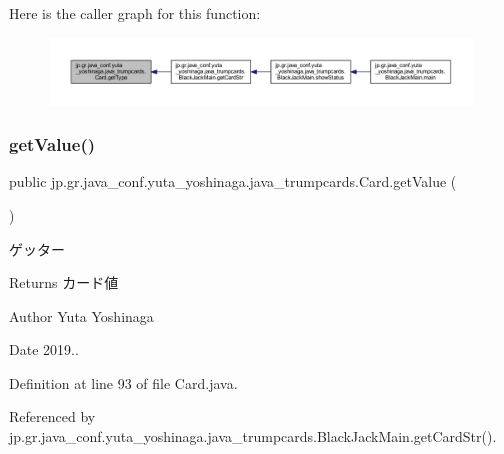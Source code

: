 Here is the caller graph for this function\+:
\nopagebreak
\begin{figure}[H]
\begin{center}
\leavevmode
\includegraphics[width=350pt]{classjp_1_1gr_1_1java__conf_1_1yuta__yoshinaga_1_1java__trumpcards_1_1_card_a5e3f4e60a101867dfed9db97f417465d_icgraph}
\end{center}
\end{figure}
\mbox{\label{classjp_1_1gr_1_1java__conf_1_1yuta__yoshinaga_1_1java__trumpcards_1_1_card_aebe71c344f7ef4d1f15d4d30d08898d0}} 
\subsubsection{\texorpdfstring{get\+Value()}{getValue()}}
{\footnotesize\ttfamily public jp.\+gr.\+java\+\_\+conf.\+yuta\+\_\+yoshinaga.\+java\+\_\+trumpcards.\+Card.\+get\+Value (\begin{DoxyParamCaption}{ }\end{DoxyParamCaption})}



ゲッター 

\begin{DoxyReturn}{Returns}
カード値 
\end{DoxyReturn}
\begin{DoxyAuthor}{Author}
Yuta Yoshinaga 
\end{DoxyAuthor}
\begin{DoxyDate}{Date}
2019.. 
\end{DoxyDate}


Definition at line 93 of file Card.\+java.



Referenced by jp.\+gr.\+java\+\_\+conf.\+yuta\+\_\+yoshinaga.\+java\+\_\+trumpcards.\+Black\+Jack\+Main.\+get\+Card\+Str().

